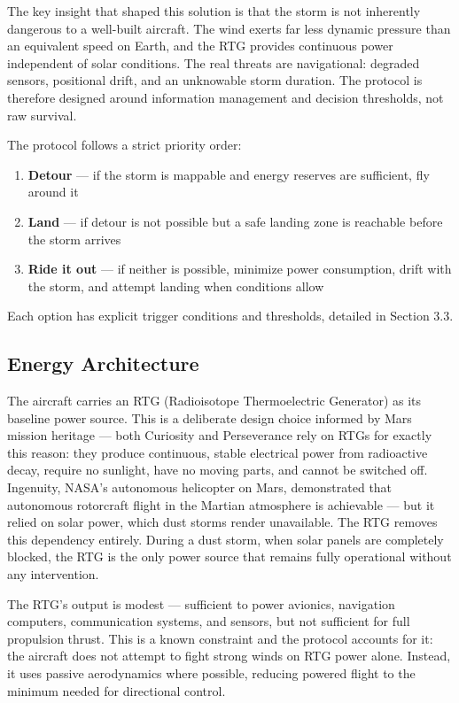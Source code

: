 \documentclass[a4paper,12pt]{article}
\begin{document}
The key insight that shaped this solution is that the storm is not inherently dangerous to a
well-built aircraft. The wind exerts far less dynamic pressure than an equivalent speed on Earth,
and the RTG provides continuous power independent of solar conditions. The real threats are
navigational: degraded sensors, positional drift, and an unknowable storm duration. The protocol
is therefore designed around information management and decision thresholds, not raw survival.

The protocol follows a strict priority order:
\begin{enumerate}[itemsep=0.3em]
    \item \textbf{Detour} — if the storm is mappable and energy reserves are sufficient, fly around it
    \item \textbf{Land} — if detour is not possible but a safe landing zone is reachable before the storm arrives
    \item \textbf{Ride it out} — if neither is possible, minimize power consumption, drift with the storm,
    and attempt landing when conditions allow
\end{enumerate}

Each option has explicit trigger conditions and thresholds, detailed in Section 3.3.

\subsection{Energy Architecture}
The aircraft carries an RTG (Radioisotope Thermoelectric Generator) as its baseline power source.
This is a deliberate design choice informed by Mars mission heritage — both Curiosity and Perseverance
rely on RTGs for exactly this reason: they produce continuous, stable electrical power from radioactive
decay, require no sunlight, have no moving parts, and cannot be switched off. Ingenuity, NASA's
autonomous helicopter on Mars, demonstrated that autonomous rotorcraft flight in the Martian
atmosphere is achievable \cite{nasa_ingenuity} — but it relied on solar power, which dust storms
render unavailable. The RTG removes this dependency entirely. During a dust storm,
when solar panels are completely blocked, the RTG is the only power source that remains fully
operational without any intervention.

The RTG's output is modest — sufficient to power avionics, navigation computers, communication
systems, and sensors, but not sufficient for full propulsion thrust. This is a known constraint
and the protocol accounts for it: the aircraft does not attempt to fight strong winds on RTG power
alone. Instead, it uses passive aerodynamics where possible, reducing powered flight to the minimum
needed for directional control.
\end{document}
